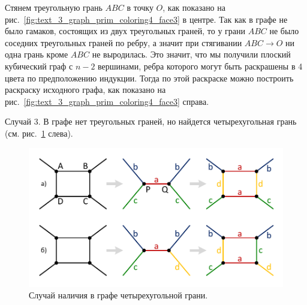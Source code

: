 Стянем треугольную грань $ABC$ в точку $O$, как показано на рис.~\ref{fig:text_3_graph_prim_coloring4_face3} в центре.
Так как в графе не было гамаков, состоящих из двух треугольных граней, то у грани $ABC$ не было соседних треугольных граней по ребру, а значит при стягивании $ABC \rightarrow O$ ни одна грань кроме $ABC$ не выродилась.
Это значит, что мы получили плоский кубический граф с $n - 2$ вершинами, ребра которого могут быть раскрашены в 4 цвета по предположению индукции.
Тогда по этой раскраске можно построить раскраску исходного графа, как показано на рис.~\ref{fig:text_3_graph_prim_coloring4_face3} справа.

Случай 3. В графе нет треугольных граней, но найдется четырехугольная грань (см. рис.~\ref{fig:text_3_graph_prim_coloring4_face4} слева).

\begin{figure}[ht]
\centering
\includegraphics[width=1.0\textwidth]{fig/par_coloring4_face4.pdf}
\singlespacing
{}\caption{Случай наличия в графе четырехугольной грани.}
\label{fig:text_3_graph_prim_coloring4_face4}
\end{figure}

